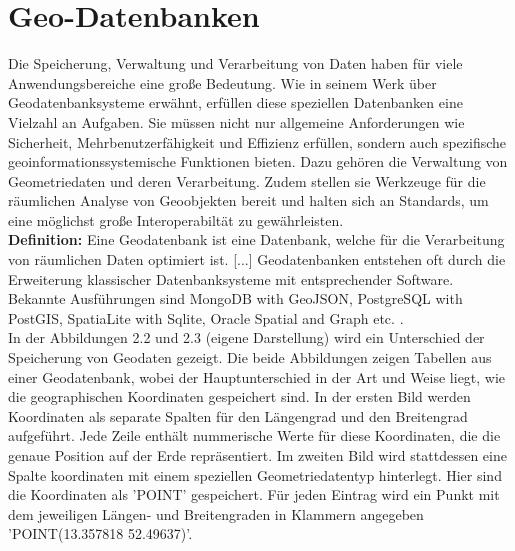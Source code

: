 \section{Geo-Datenbanken}
\label{sec:Datenbanken}

Die Speicherung, Verwaltung und Verarbeitung von Daten haben für viele Anwendungsbereiche eine große Bedeutung.  Wie \cite{brinkhoff_geodatenbanksysteme_2022} in seinem Werk über Geodatenbanksysteme erwähnt, erfüllen diese speziellen Datenbanken eine Vielzahl an Aufgaben. Sie müssen nicht nur allgemeine Anforderungen wie Sicherheit, Mehrbenutzerfähigkeit und Effizienz erfüllen, sondern auch spezifische geoinformationssystemische Funktionen bieten. Dazu gehören die Verwaltung von Geometriedaten und deren Verarbeitung. Zudem stellen sie Werkzeuge für die räumlichen Analyse von Geoobjekten bereit und halten sich an Standards, um eine möglichst große Interoperabiltät zu gewährleisten. \\

\textbf{Definition: }Eine Geodatenbank ist eine Datenbank, welche für die Verarbeitung von räumlichen Daten optimiert ist. [...] Geodatenbanken entstehen oft durch die Erweiterung klassischer Datenbanksysteme mit entsprechender Software. Bekannte Ausführungen sind MongoDB with GeoJSON, PostgreSQL with PostGIS, SpatiaLite with Sqlite, Oracle Spatial and Graph etc. \citep{wiki-geodatenbank}.\\

In der Abbildungen 2.2 und 2.3 (eigene Darstellung) wird ein Unterschied der Speicherung von Geodaten gezeigt. Die beide Abbildungen zeigen Tabellen aus einer Geodatenbank, wobei der Hauptunterschied in der Art und Weise liegt, wie die geographischen Koordinaten gespeichert sind. In der ersten Bild werden Koordinaten als separate Spalten für den Längengrad und den Breitengrad aufgeführt. Jede Zeile enthält nummerische Werte für diese Koordinaten, die die genaue Position auf der Erde repräsentiert. Im zweiten Bild wird stattdessen eine Spalte koordinaten mit einem speziellen Geometriedatentyp hinterlegt. Hier sind die Koordinaten als 'POINT' gespeichert. Für jeden Eintrag wird ein Punkt mit dem jeweiligen Längen- und Breitengraden in Klammern angegeben 'POINT(13.357818 52.49637)'. \\

